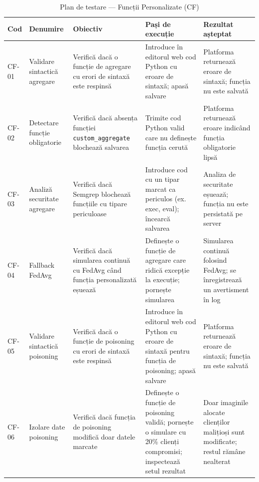 \documentclass[../../main.tex]{subfiles}
\begin{document}
    \begin{table}[H]
        \centering
        \footnotesize
        \begin{tabular}{|p{}|p{}|p{}|p{}|p{}|}
            \hline
            \textbf{Cod} & \textbf{Denumire} & \textbf{Obiectiv} & \textbf{Pași de execuție} & \textbf{Rezultat așteptat} \\
            \hline
            CF-01 & Validare sintactică agregare & Verifică dacă o funcție de agregare cu erori de sintaxă este respinsă & Introduce în editorul web cod Python cu eroare de sintaxă; apasă salvare & Platforma returnează eroare de sintaxă; funcția nu este salvată \\
            \hline
            CF-02 & Detectare funcție obligatorie & Verifică dacă absența funcției \texttt{custom\_aggregate} blochează salvarea & Trimite cod Python valid care nu definește funcția cerută & Platforma returnează eroare indicând funcția obligatorie lipsă \\
            \hline
            CF-03 & Analiză securitate agregare & Verifică dacă Semgrep blochează funcțiile cu tipare periculoase & Introduce cod cu un tipar marcat ca periculos (ex. exec, eval); încearcă salvarea & Analiza de securitate eșuează; funcția nu este persistată pe server \\
            \hline
            CF-04 & Fallback FedAvg & Verifică dacă simularea continuă cu FedAvg când funcția personalizată eșuează & Definește o funcție de agregare care ridică excepție la execuție; pornește simularea & Simularea continuă folosind FedAvg; se înregistrează un avertisment în log \\
            \hline
            CF-05 & Validare sintactică poisoning & Verifică dacă o funcție de poisoning cu erori de sintaxă este respinsă & Introduce în editorul web cod Python cu eroare de sintaxă pentru funcția de poisoning; apasă salvare & Platforma returnează eroare de sintaxă; funcția nu este salvată \\
            \hline
            CF-06 & Izolare date poisoning & Verifică dacă funcția de poisoning modifică doar datele marcate & Definește o funcție de poisoning validă; pornește o simulare cu 20\% clienți compromisi; inspectează setul rezultat & Doar imaginile alocate clienților malițioși sunt modificate; restul rămâne nealterat \\
            \hline
        \end{tabular}
        \caption{Plan de testare --- Funcții Personalizate (CF)}
        \label{tab:test_cf}
    \end{table}
\end{document}
